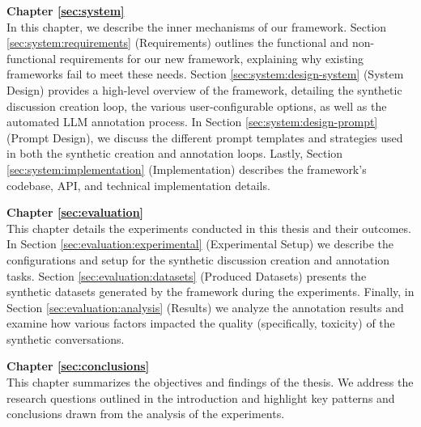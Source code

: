 \textbf{Chapter \ref{sec:system}} \\[0.2em]

In this chapter, we describe the inner mechanisms of our framework. Section \ref{sec:system:requirements} (Requirements) outlines the functional and non-functional requirements for our new framework, explaining why existing frameworks fail to meet these needs. Section \ref{sec:system:design-system} (System Design) provides a high-level overview of the framework, detailing the synthetic discussion creation loop, the various user-configurable options, as well as the automated LLM annotation process. In Section \ref{sec:system:design-prompt} (Prompt Design), we discuss the different prompt templates and strategies used in both the synthetic creation and annotation loops. Lastly, Section \ref{sec:system:implementation} (Implementation) describes the framework's codebase, API, and technical implementation details.

\textbf{Chapter \ref{sec:evaluation}} \\[0.2em]

This chapter details the experiments conducted in this thesis and their outcomes. In Section \ref{sec:evaluation:experimental} (Experimental Setup) we describe the configurations and setup for the synthetic discussion creation and annotation tasks. Section \ref{sec:evaluation:datasets} (Produced Datasets)  presents the synthetic datasets generated by the framework during the experiments.  Finally, in Section \ref{sec:evaluation:analysis} (Results) we analyze the annotation results and examine how various factors impacted the quality (specifically, toxicity) of the synthetic conversations.


\textbf{Chapter \ref{sec:conclusions}} \\[0.2em]

This chapter summarizes the objectives and findings of the thesis. We address the research questions outlined in the introduction and highlight key patterns and conclusions drawn from the analysis of the experiments.



